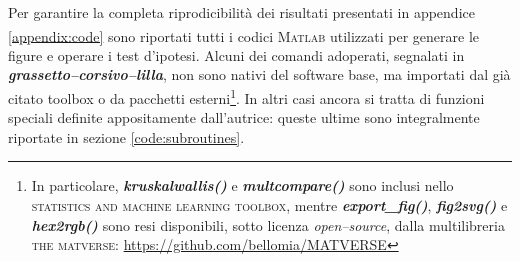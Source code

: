 Per garantire la completa riprodicibilità dei risultati presentati in appendice \ref{appendix:code} sono riportati tutti i codici \textsc{Matlab}\textsuperscript{\tiny\sffamily\textregistered} utilizzati per generare le figure e operare i test d'ipotesi. Alcuni dei comandi adoperati, segnalati in {\mlttfamily\color{xkcdLilac}\bfseries\itshape grassetto--corsivo--lilla}, non sono nativi del software base, ma importati dal già citato toolbox o da pacchetti esterni\footnote{In particolare, {\mlttfamily\bfseries\itshape\color{xkcdLilac}kruskalwallis()} e {\mlttfamily\bfseries\itshape\color{xkcdLilac}multcompare()} sono inclusi nello \textsc{statistics and machine learning toolbox}, mentre {\mlttfamily\bfseries\itshape\color{xkcdLilac}export\_fig()}, {\mlttfamily\bfseries\itshape\color{xkcdLilac}fig2svg()} e {\mlttfamily\bfseries\itshape\color{xkcdLilac}hex2rgb()} sono resi disponibili, sotto licenza \emph{open--source}, dalla multilibreria \textsc{the matverse}: \url{https://github.com/bellomia/MATVERSE} }. In altri casi ancora si tratta di funzioni speciali definite appositamente dall'autrice: queste ultime sono integralmente riportate in sezione \ref{code:subroutines}.




